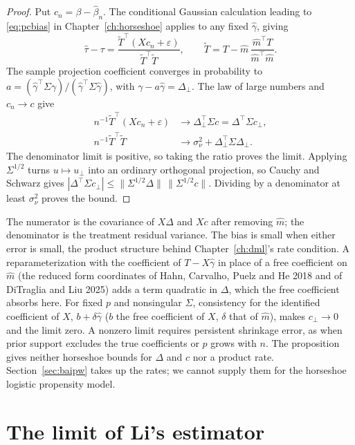 \begin{proof}
Put $c_n = \beta - \hat\beta_n$. The conditional Gaussian calculation leading to \eqref{eq:pcbias} in Chapter~\ref{ch:horseshoe} applies to any fixed $\hat\gamma$, giving
\[
\hat\tau - \tau = \frac{\tilde T^\top(Xc_n+\varepsilon)}{\tilde T^\top\tilde T},
\qquad
\tilde T = T-\hat m\,\frac{\hat m^\top T}{\hat m^\top\hat m}.
\]
The sample projection coefficient converges in probability to $a=(\hat\gamma^\top\Sigma\gamma)/(\hat\gamma^\top\Sigma\hat\gamma)$, with $\gamma-a\hat\gamma=\Delta_\perp$. The law of large numbers and $c_n\to c$ give
\[
\begin{aligned}
n^{-1}\tilde T^\top(Xc_n+\varepsilon)&\longrightarrow\Delta_\perp^\top\Sigma c=\Delta^\top\Sigma c_\perp,\\
n^{-1}\tilde T^\top\tilde T&\longrightarrow\sigma_\nu^2+\Delta_\perp^\top\Sigma\Delta_\perp.
\end{aligned}
\]
The denominator limit is positive, so taking the ratio proves the limit. Applying $\Sigma^{1/2}$ turns $u\mapsto u_\perp$ into an ordinary orthogonal projection, so Cauchy and Schwarz gives $|\Delta^\top\Sigma c_\perp|\le\|\Sigma^{1/2}\Delta\|\,\|\Sigma^{1/2}c\|$. Dividing by a denominator at least $\sigma_\nu^2$ proves the bound.
\end{proof}

The numerator is the covariance of $X\Delta$ and $Xc$ after removing $\hat m$; the denominator is the treatment residual variance. The bias is small when either error is small, the product structure behind Chapter~\ref{ch:dml}'s rate condition. A reparameterization with the coefficient of $T-X\hat\gamma$ in place of a free coefficient on $\hat m$ (the reduced form coordinates of Hahn, Carvalho, Puelz and He 2018 and of DiTraglia and Liu 2025) adds a term quadratic in $\Delta$, which the free coefficient absorbs here. For fixed $p$ and nonsingular $\Sigma$, consistency for the identified coefficient of $X$, $b+\delta\hat\gamma$ ($b$ the free coefficient of $X$, $\delta$ that of $\hat m$), makes $c_\perp\to0$ and the limit zero. A nonzero limit requires persistent shrinkage error, as when prior support excludes the true coefficients or $p$ grows with $n$. The proposition gives neither horseshoe bounds for $\Delta$ and $c$ nor a product rate. Section~\ref{sec:baipw} takes up the rates; we cannot supply them for the horseshoe logistic propensity model.

\section{The limit of Li's estimator}

